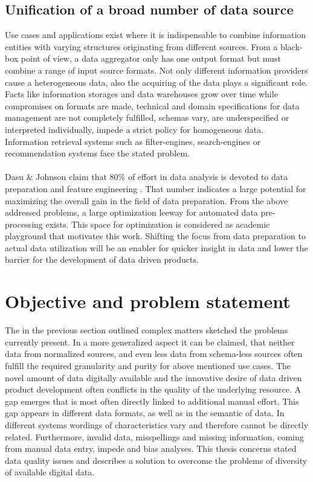 \subsection{Unification of a broad number of data source} 

Use cases and applications exist where it is indispensable to combine information entities with varying structures originating from different sources. From a black-box point of view, a data aggregator only has one output format but must combine a range of input source formats. Not only different information providers cause a heterogeneous data, also the acquiring of the data plays a significant role. Facts like information storages and data warehouses grow over time while compromises on formats are made, technical and domain specifications for data management are not completely fulfilled, schemas vary, are underspecified or interpreted individually, impede a strict policy for homogeneous data. Information retrieval systems such as filter-engines, search-engines or recommendation systems face the stated problem. 
\\\\
Dasu \& Johnson claim that 80\% of effort in data analysis is devoted to data preparation and feature engineering \cite{dasu_johnson_2003}. That number indicates a large potential for maximizing the overall gain in the field of data preparation. From the above addressed problems, a large optimization leeway for automated data pre-processing exists. This space for optimization is considered as academic playground that motivates this work. Shifting the focus from data preparation to actual data utilization will be an enabler for quicker insight in data and lower the barrier for the development of data driven products.

\section{Objective and problem statement\label{sec:objective}}
The in the previous section outlined complex matters sketched the problems currently present. In a more generalized aspect it can be claimed, that neither data from normalized sources, and even less data from schema-less sources often fulfill the required granularity and purity for above mentioned use cases. The novel amount of data digitally available and the innovative desire of data driven product development often conflicts in the quality of the underlying resource. A gap emerges that is most often directly linked to additional manual effort. This gap appears in different data formats, as well as in the semantic of data. In different systems wordings of characteristics vary and therefore cannot be directly related. Furthermore, invalid data, misspellings and missing information, coming from manual data entry, impede and bias analyses. This thesis concerns stated data quality issues and describes a solution to overcome the problems of diversity of available digital data.  

